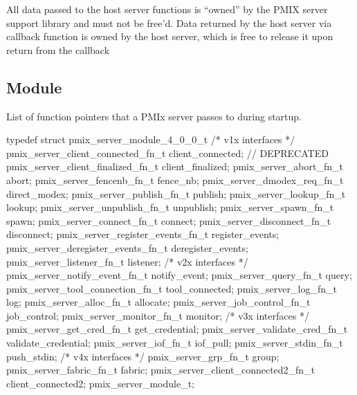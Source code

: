 All data passed to the host server functions is ``owned'' by the
PMIX server support library and must not be free'd. Data returned
by the host server via callback function is owned by the host
server, which is free to release it upon return from the callback
\advicermend

\subsection{ Module}
\label{server:module_fns}
\summary

List of function pointers that a PMIx server passes to  during startup.

\format

\cspecificstart
\begin{codepar}
typedef struct pmix_server_module_4_0_0_t {
    /* v1x interfaces */
    pmix_server_client_connected_fn_t   client_connected;  // DEPRECATED
    pmix_server_client_finalized_fn_t   client_finalized;
    pmix_server_abort_fn_t              abort;
    pmix_server_fencenb_fn_t            fence_nb;
    pmix_server_dmodex_req_fn_t         direct_modex;
    pmix_server_publish_fn_t            publish;
    pmix_server_lookup_fn_t             lookup;
    pmix_server_unpublish_fn_t          unpublish;
    pmix_server_spawn_fn_t              spawn;
    pmix_server_connect_fn_t            connect;
    pmix_server_disconnect_fn_t         disconnect;
    pmix_server_register_events_fn_t    register_events;
    pmix_server_deregister_events_fn_t  deregister_events;
    pmix_server_listener_fn_t           listener;
    /* v2x interfaces */
    pmix_server_notify_event_fn_t       notify_event;
    pmix_server_query_fn_t              query;
    pmix_server_tool_connection_fn_t    tool_connected;
    pmix_server_log_fn_t                log;
    pmix_server_alloc_fn_t              allocate;
    pmix_server_job_control_fn_t        job_control;
    pmix_server_monitor_fn_t            monitor;
    /* v3x interfaces */
    pmix_server_get_cred_fn_t           get_credential;
    pmix_server_validate_cred_fn_t      validate_credential;
    pmix_server_iof_fn_t                iof_pull;
    pmix_server_stdin_fn_t              push_stdin;
    /* v4x interfaces */
    pmix_server_grp_fn_t                group;
    pmix_server_fabric_fn_t             fabric;
    pmix_server_client_connected2_fn_t  client_connected2;
} pmix_server_module_t;
\end{codepar}
\cspecificend

